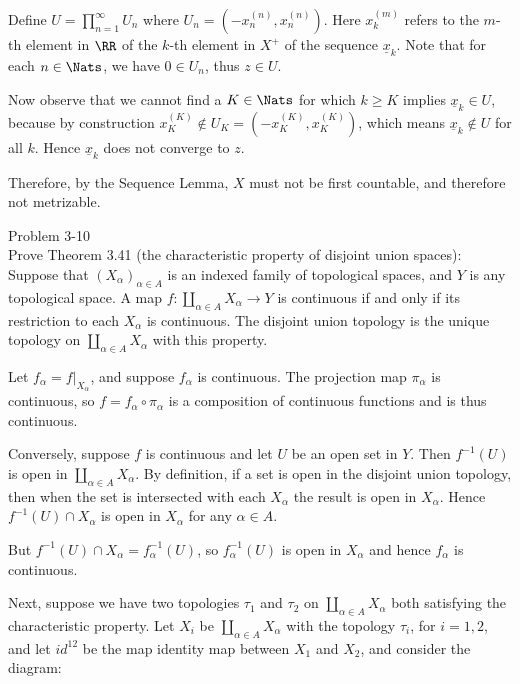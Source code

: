 \documentclass{homework651}
\newcommand\nextprob{\newpage}
\begin{document}
\begin{aproblems}
Define $U=\prod_{n=1}^{\infty} U_n$ where $U_n=(-x_n^{(n)}, x_n^{(n)})$.
Here $x_k^{(m)}$ refers to the $m$-th element in $\RR$ of the $k$-th
element in $X^+$ of the sequence $\underline{x}_k$.  Note that for each $n\in\Nats$,
we have $0\in U_n$, thus $z\in U$.

Now observe that we cannot find a $K\in\Nats$ for which
$k\ge K$ implies $\underline{x}_k \in U$, because by construction
$x_K^{(K)}\not\in U_K=(-x_K^{(K)},x_K^{(K)})$, which means
$\underline{x}_k\not\in U$ for all $k$.  Hence $\underline{x}_k$
does not converge to $z$.

\vspace{.2in}

Therefore, by the Sequence Lemma, $X$ must not be first countable, and therefore
not metrizable.
 
\nextprob
\hproblem Problem 3-10\\
Prove Theorem 3.41 (the characteristic property of disjoint union spaces): Suppose
that $(X_\alpha)_{\alpha\in A}$ is an indexed family of topological spaces, and
$Y$ is any topological space.  A map
$f:\coprod_{\alpha\in A} X_\alpha \rightarrow Y$ is continuous if and only if
its restriction to each $X_\alpha$ is continuous.  The disjoint union topology
is the unique topology on $\coprod_{\alpha\in A}X_\alpha$ with this property.

\solution

\centerline{}

Let $f_\alpha=f|_{X_\alpha}$, and suppose $f_\alpha$ is continuous. The projection
map $\pi_\alpha$ is continuous, so $f=f_\alpha\circ\pi_\alpha$ is a composition
of continuous functions and is thus continuous.

Conversely, suppose $f$ is continuous and let $U$ be an open set in $Y$.
Then $f^{-1}(U)$ is open in $\coprod_{\alpha\in A} X_\alpha$.  By definition,
if a set is open in the disjoint union topology, then when the set is intersected
with each $X_\alpha$ the result is open in $X_\alpha$.  Hence
$f^{-1}(U)\cap X_\alpha$ is open in $X_\alpha$ for any $\alpha\in A$.

But $f^{-1}(U)\cap X_\alpha = f_\alpha^{-1}(U)$, so $f_\alpha^{-1}(U)$ is
open in $X_\alpha$ and hence $f_\alpha$ is continuous.

\vspace{.2in}

Next, suppose we have two topologies $\tau_1$ and $\tau_2$ on
$\coprod_{\alpha\in A} X_\alpha$ both satisfying the characteristic property.
Let $X_i$ be  $\coprod_{\alpha\in A} X_\alpha$ with the topology $\tau_i$,
for $i=1,2$, and let $id^{12}$ be the map identity map between $X_1$ and $X_2$,
and consider the diagram:


\end{aproblems}
\end{document}
